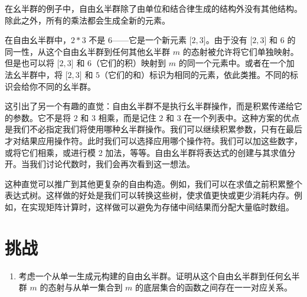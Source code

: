 \noindent
在幺半群的例子中，自由幺半群除了由单位和结合律生成的结构外没有其他结构。除此之外，所有的乘法都会生成全新的元素。

在自由幺半群中，$2 * 3$ 不是 $6$——它是一个新元素 ${[}2, 3{]}$。由于没有 ${[}2, 3{]}$ 和 $6$ 的同一性，从这个自由幺半群到任何其他幺半群 $m$ 的态射被允许将它们单独映射。但是也可以将 ${[}2, 3{]}$ 和 $6$（它们的积）映射到 $m$ 的同一个元素中。或者在一个加法幺半群中，将 ${[}2, 3{]}$ 和 $5$（它们的和）标识为相同的元素，依此类推。不同的标识会给你不同的幺半群。

这引出了另一个有趣的直觉：自由幺半群不是执行幺半群操作，而是积累传递给它的参数。它不是将 $2$ 和 $3$ 相乘，而是记住 $2$ 和 $3$ 在一个列表中。这种方案的优点是我们不必指定我们将使用哪种幺半群操作。我们可以继续积累参数，只有在最后才对结果应用操作符。此时我们可以选择应用哪个操作符。我们可以加这些数字，或将它们相乘，或进行模 2 加法，等等。自由幺半群将表达式的创建与其求值分开。当我们讨论代数时，我们会再次看到这一想法。

这种直觉可以推广到其他更复杂的自由构造。例如，我们可以在求值之前积累整个表达式树。这样做的好处是我们可以转换这些树，使求值更快或更少消耗内存。例如，在实现矩阵计算时，这样做可以避免为存储中间结果而分配大量临时数组。

\section{挑战}

\begin{enumerate}
  \tightlist
  \item
  考虑一个从单一生成元构建的自由幺半群。证明从这个自由幺半群到任何幺半群 $m$ 的态射与从单一集合到 $m$ 的底层集合的函数之间存在一一对应关系。
\end{enumerate}
